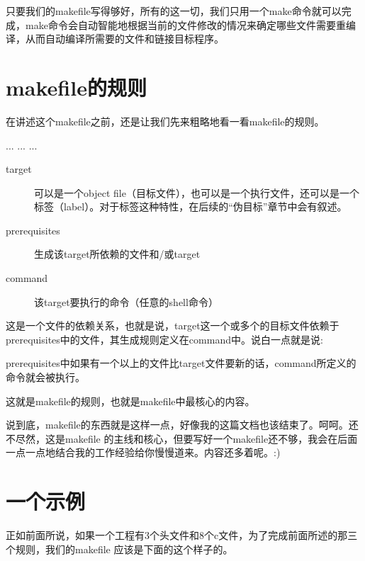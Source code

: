 \documentclass[a4paper,10pt]{sphinxmanual}
\begin{document}
只要我们的makefile写得够好，所有的这一切，我们只用一个make命令就可以完成，make命令会自动智能地根据当前的文件修改的情况来确定哪些文件需要重编译，从而自动编译所需要的文件和链接目标程序。


\section{makefile的规则}
\label{\detokenize{introduction:id1}}
在讲述这个makefile之前，还是让我们先来粗略地看一看makefile的规则。

\begin{sphinxVerbatim}[commandchars=\\\{\}]
  ...
    ...
    ...
\end{sphinxVerbatim}
\begin{description}
\item[{target}] \leavevmode
可以是一个object file（目标文件），也可以是一个执行文件，还可以是一个标签（label）。对于标签这种特性，在后续的“伪目标”章节中会有叙述。

\item[{prerequisites}] \leavevmode
生成该target所依赖的文件和/或target

\item[{command}] \leavevmode
该target要执行的命令（任意的shell命令）

\end{description}

这是一个文件的依赖关系，也就是说，target这一个或多个的目标文件依赖于prerequisites中的文件，其生成规则定义在command中。说白一点就是说:

\begin{sphinxVerbatim}[commandchars=\\\{\}]
prerequisites中如果有一个以上的文件比target文件要新的话，command所定义的命令就会被执行。
\end{sphinxVerbatim}

这就是makefile的规则，也就是makefile中最核心的内容。

说到底，makefile的东西就是这样一点，好像我的这篇文档也该结束了。呵呵。还不尽然，这是makefile
的主线和核心，但要写好一个makefile还不够，我会在后面一点一点地结合我的工作经验给你慢慢道来。内容还多着呢。:)


\section{一个示例}
\label{\detokenize{introduction:id2}}
正如前面所说，如果一个工程有3个头文件和8个c文件，为了完成前面所述的那三个规则，我们的makefile
应该是下面的这个样子的。
\end{document}
